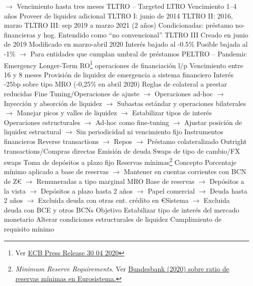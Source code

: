 \documentclass{nuevotema}
\begin{document}
\begin{esquemal}
				\4[] $\to$ Vencimiento hasta tres meses
				\4 TLTRO -- Targeted LTRO
				\4[] Vencimiento 1--4 años
				\4[] Proveer de liquidez adicional
				\4[] TLTRO I: junio de 2014
				\4[] TLTRO II: 2016, marzo
				\4[] TLTRO III: sep 2019 a marzo 2021 (2 años)
				\4[] Condicionadas: préstamo no-financieras y hog.
				\4[] Entendido como ``no convencional''
				\4 TLTRO III
				\4[] Creado en junio de 2019
				\4[] Modificado en marzo-abril 2020
				\4[] Interés bajado al -0.5\%
				\4[] Posible bajada al -1\%
				\4[] $\to$ Para entidades que cumplan umbral de préstamos
				\4 PELTRO -- Pandemic Emergency Longer-Term RO\footnote{Ver \href{https://www.ecb.europa.eu/press/pr/date/2020/html/ecb.pr200430_1~477f400e39.en.html}{ECB Press Release 30 04 2020}}
				 operaciones de financiación l/p
				\4[] Vencimiento entre 16 y 8 meses
				\4[] Provisión de liquidez de emergencia a sistema financiero
				\4[] Interés -25bp sobre tipo MRO (-0,25\% en abril 2020)
				\4[] Reglas de colateral a prestar reducidas
				\4 Fine Tuning/Operaciones de ajuste
				\4[] $\to$ Operaciones ad-hoc
				\4[] $\to$ Inyección y absorción de liquidez
				\4[] $\to$ Subastas estándar y operaciones bilaterales
				\4[] $\to$ Manejar picos y valles de liquidez
				\4[] $\to$ Estabilizar tipos de interés
				\4 Operaciones estructurales
				\4[] $\to$ Ad-hoc como fine-tuning
				\4[] $\to$ Ajustar posición de liquidez estructural
				\4[] $\to$ Sin periodicidad ni vencimiento fijo
				\4 Instrumentos financieros
				\4[] Reverse transactions
				\4[] $\to$ Repos
				\4[] $\to$ Préstamo colateralizado
				\4[] Outright transactions/Compras directas
				\4[] Emisión de deuda
				\4[] Swaps de tipo de cambio/FX swaps
				\4[] Toma de depósitos a plazo fijo
			\3 Reservas mínimas\footnote{\textit{Minimum Reserve Requirements}. Ver \href{https://www.bundesbank.de/en/tasks/monetary-policy/minimum-reserves/minimum-reserves-625912}{Bundesbank (2020) sobre ratio de reservas mínimas en Eurosistema.}}
				\4 Concepto
				\4[] Porcentaje mínimo aplicado a base de reservas
				\4[] $\to$ Mantener en cuentas corrientes con BCN de Z€
				\4[] $\to$ Remuneradas a tipo marginal MRO
				\4[] Base de reservas
				\4[] $\to$ Depósitos a la vista
				\4[] $\to$ Depósitos a plazo hasta 2 años
				\4[] $\to$ Papel comercial
				\4[] $\to$ Deuda hasta 2 años
				\4[] $\to$ Excluida deuda con otras ent. crédito en €Sistema
				\4[] $\to$ Excluida deuda con BCE y otros BCNs
				\4 Objetivo
				\4[] Estabilizar tipo de interés del mercado monetario
				\4[] Alterar condiciones estructurales de liquidez
				\4 Cumplimiento de requisito mínimo

\end{esquemal}
\end{document}

